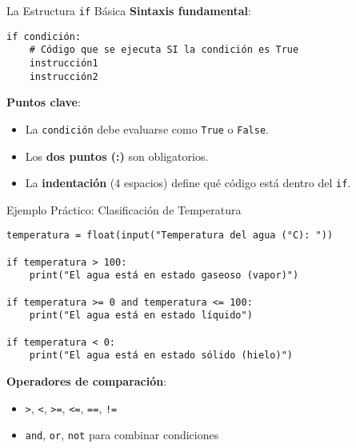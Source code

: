 \documentclass[10pt]{beamer}
\begin{document}
\begin{frame}[fragile]{La Estructura \texttt{if} Básica}
  \textbf{Sintaxis fundamental}:
  \begin{verbatim}
if condición:
    # Código que se ejecuta SI la condición es True
    instrucción1
    instrucción2
  \end{verbatim}
  
  \textbf{Puntos clave}:
  \begin{itemize}
    \item La \texttt{condición} debe evaluarse como \texttt{True} o \texttt{False}.
    \item Los \textbf{dos puntos (:)} son obligatorios.
    \item La \textbf{indentación} (4 espacios) define qué código está dentro del \texttt{if}.
  \end{itemize}
\end{frame}

\begin{frame}[fragile]{Ejemplo Práctico: Clasificación de Temperatura}
\begin{verbatim}
temperatura = float(input("Temperatura del agua (°C): "))

if temperatura > 100:
    print("El agua está en estado gaseoso (vapor)")
    
if temperatura >= 0 and temperatura <= 100:
    print("El agua está en estado líquido")
    
if temperatura < 0:
    print("El agua está en estado sólido (hielo)")
\end{verbatim}

\textbf{Operadores de comparación}:
\begin{itemize}
  \item \texttt{>}, \texttt{<}, \texttt{>=}, \texttt{<=}, \texttt{==}, \texttt{!=}
  \item \texttt{and}, \texttt{or}, \texttt{not} para combinar condiciones
\end{itemize}
\end{frame}
\end{document}

